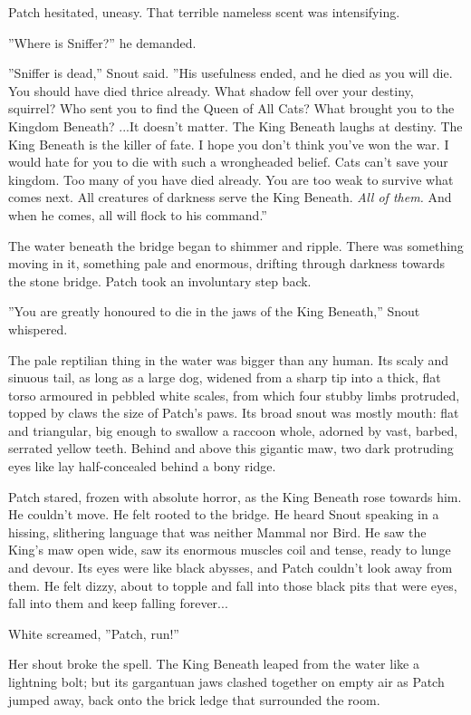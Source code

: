 \documentclass[12pt]{book}
\begin{document}
Patch hesitated, uneasy. That terrible nameless scent was intensifying.\par
''Where is Sniffer?'' he demanded.\par
''Sniffer is dead,'' Snout said. ''His usefulness ended, and he died as you will die. You should have died thrice already. What shadow fell over your destiny, squirrel? Who sent you to find the Queen of All Cats? What brought you to the Kingdom Beneath? ...It doesn't matter. The King Beneath laughs at destiny. The King Beneath is the killer of fate. I hope you don't think you've won the war. I would hate for you to die with such a wrongheaded belief. Cats can't save your kingdom. Too many of you have died already. You are too weak to survive what comes next. All creatures of darkness serve the King Beneath. {\it All of them.} And when he comes, all will flock to his command.''\par
 The water beneath the bridge began to shimmer and ripple. There was something moving in it, something pale and enormous, drifting through darkness towards the stone bridge. Patch took an involuntary step back.\par
 ''You are greatly honoured to die in the jaws of the King Beneath,'' Snout whispered.\par
 The pale reptilian thing in the water was bigger than any human. Its scaly and sinuous tail, as long as a large dog, widened from a sharp tip into a thick, flat torso armoured in pebbled white scales, from which four stubby limbs protruded, topped by claws the size of Patch's paws. Its broad snout was mostly mouth: flat and triangular, big enough to swallow a raccoon whole, adorned by vast, barbed, serrated yellow teeth. Behind and above this gigantic maw, two dark protruding eyes like lay half-concealed behind a bony ridge.\par
Patch stared, frozen with absolute horror, as the King Beneath rose towards him. He couldn't move. He felt rooted to the bridge. He heard Snout speaking in a hissing, slithering language that was neither Mammal nor Bird. He saw the King's maw open wide, saw its enormous muscles coil and tense, ready to lunge and devour. Its eyes were like black abysses, and Patch couldn't look away from them. He felt dizzy, about to topple and fall into those black pits that were eyes, fall into them and keep falling forever...\par
White screamed, ''Patch, run!''\par
Her shout broke the spell. The King Beneath leaped from the water like a lightning bolt; but its gargantuan jaws clashed together on empty air as Patch jumped away, back onto the brick ledge that surrounded the room.\par
\end{document}
